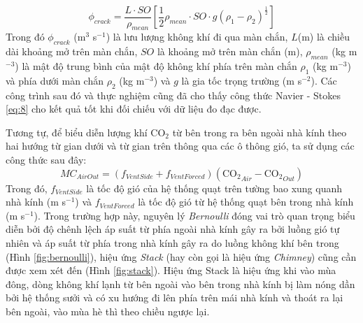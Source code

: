 \documentclass[a4paper]{article}
\begin{document}
\begin{equation}\label{eq:8}
    \phi_{crack} = \frac{L\cdot SO}{\rho_{mean}} \left[ \frac{1}{2} \rho_{mean}\cdot SO \cdot g(\rho_1 - \rho_2)^\frac{1}{2} \right]
\end{equation}
Trong đó $\phi_{crack}$ (m$^3$ s$^{-1}$) là lưu lượng không khí đi qua màn chắn, $L$(m) là chiều dài khoảng mở trên màn chắn, $SO$ là khoảng mở trên màn chắn (m), $\rho_{mean}$ (kg m$^{-3}$) là mật độ trung bình của mật độ không khí phía trên màn chắn $\rho_1$ (kg m$^{-3}$) và phía dưới màn chắn $\rho_2$ (kg m$^{-3}$) và $g$ là gia tốc trọng trường (m s$^{-2}$). Các công trình sau đó và thực nghiệm cũng đã cho thấy công thức Navier - Stokes \eqref{eq:8} cho kết quả tốt khi đối chiếu với dữ liệu đo đạc được. 
\par
Tương tự, để biểu diễn lượng khí $\mathrm{CO_2}$ từ bên trong ra bên ngoài nhà kính theo hai hướng từ gian dưới và từ gian trên thông qua các ô thông gió, ta sử dụng các công thức sau đây:
\begin{equation}\label{eq:9}
    MC_{AirOut} = (f_{VentSide} + f_{VentForced})(\mathrm{CO_{2}}_{Air} - \mathrm{CO_{2}}_{Out})
\end{equation}
Trong đó, $f_{VentSide}$ là tốc độ gió của hệ thống quạt trên tường bao xung quanh nhà kính (m s$^{-1}$) và $f_{VentForced}$ là tốc độ gió từ hệ thống quạt bên trong nhà kính (m s$^{-1}$). Trong trường hợp này, nguyên lý \emph{Bernoulli} đóng vai trò quan trọng biểu diễn bởi độ chênh lệch áp suất từ phía ngoài nhà kính gây ra bởi luồng gió tự nhiên và áp suất từ phía trong nhà kính gây ra do luồng không khí bên trong (Hình \ref{fig:bernoulli}), hiệu ứng \emph{Stack} (hay còn gọi là hiệu ứng \emph{Chimney}) cũng cần được xem xét đến (Hình \ref{fig:stack}). Hiệu ứng Stack là hiệu ứng khi vào mùa đông, dòng không khí lạnh từ bên ngoài vào bên trong nhà kính bị làm nóng dần bởi hệ thống sưởi và có xu hướng đi lên phía trên mái nhà kính và thoát ra lại bên ngoài, vào mùa hè thì theo chiều ngược lại.
\end{document}
